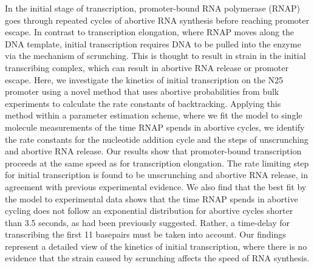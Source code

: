 In the initial stage of transcription, promoter-bound RNA polymerase (RNAP)
goes through repeated cycles of abortive RNA synthesis before reaching
promoter escape. In contrast to transcription elongation, where RNAP moves
along the DNA template, initial transcription requires DNA to be pulled into
the enzyme via the mechanism of scrunching. This is thought to result in
strain in the initial transcribing complex, which can result in abortive RNA
release or promoter escape. Here, we investigate the kinetics of initial
transcription on the N25 promoter using a novel method that uses abortive
probabilities from bulk experiments to calculate the rate constants of
backtracking. Applying this method within a parameter estimation scheme, where
we fit the model to single molecule measurements of the time RNAP spends in
abortive cycles, we identify the rate constants for the nucleotide addition
cycle and the steps of unscrunching and abortive RNA release. Our results show
that promoter-bound transcription proceeds at the same speed as for
transcription elongation. The rate limiting step for initial transcription is
found to be unscrunching and abortive RNA release, in agreement with previous
experimental evidence. We also find that the best fit by the model to
experimental data shows that the time RNAP spends in abortive cycling does not
follow an exponential distribution for abortive cycles shorter than 3.5
seconds, as had been previously suggested. Rather, a time-delay for
transcribing the first 11 basepairs must be taken into account.  Our findings
represent a detailed view of the kinetics of initial transcription, where
there is no evidence that the strain caused by scrunching affects the speed of
RNA synthesis.
